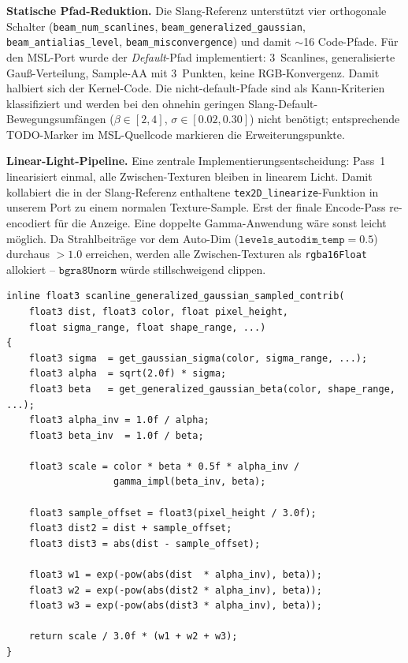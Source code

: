 \documentclass[11pt, a4paper]{article}
\begin{document}
\vspace{.5cm}
\textbf{Statische Pfad-Reduktion.} Die Slang-Referenz unterst\"utzt vier orthogonale Schalter (\texttt{beam\_num\_scanlines}, \texttt{beam\_generalized\_gaussian}, \texttt{beam\_antialias\_level}, \texttt{beam\_misconvergence}) und damit $\sim$16 Code-Pfade. F\"ur den MSL-Port wurde der \textit{Default}-Pfad implementiert: 3~Scanlines, generalisierte Gau\ss-Verteilung, Sample-AA mit 3~Punkten, keine RGB-Konvergenz. Damit halbiert sich der Kernel-Code. Die nicht-default-Pfade sind als Kann-Kriterien klassifiziert und werden bei den ohnehin geringen Slang-Default-Bewegungsumf\"angen ($\beta \in [2,4]$, $\sigma \in [0.02, 0.30]$) nicht ben\"otigt; entsprechende TODO-Marker im MSL-Quellcode markieren die Erweiterungspunkte.

\vspace{.5cm}
\textbf{Linear-Light-Pipeline.} Eine zentrale Implementierungsentscheidung: Pass~1 linearisiert einmal, alle Zwischen-Texturen bleiben in linearem Licht. Damit kollabiert die in der Slang-Referenz enthaltene \texttt{tex2D\_linearize}-Funktion in unserem Port zu einem normalen Texture-Sample. Erst der finale Encode-Pass re-encodiert f\"ur die Anzeige. Eine doppelte Gamma-Anwendung w\"are sonst leicht m\"oglich. Da Strahlbeitr\"age vor dem Auto-Dim ($\texttt{levels\_autodim\_temp} = 0.5$) durchaus $> 1.0$ erreichen, werden alle Zwischen-Texturen als \texttt{rgba16Float} allokiert -- $\texttt{bgra8Unorm}$ w\"urde stillschweigend clippen.

\vspace{.5cm}
\begin{lstlisting}[language=Metal, caption={Pass~2 -- Beam-Beitragsfunktion (3-Sample-Mittelung)}]
inline float3 scanline_generalized_gaussian_sampled_contrib(
    float3 dist, float3 color, float pixel_height,
    float sigma_range, float shape_range, ...)
{
    float3 sigma  = get_gaussian_sigma(color, sigma_range, ...);
    float3 alpha  = sqrt(2.0f) * sigma;
    float3 beta   = get_generalized_gaussian_beta(color, shape_range, ...);
    float3 alpha_inv = 1.0f / alpha;
    float3 beta_inv  = 1.0f / beta;

    float3 scale = color * beta * 0.5f * alpha_inv /
                   gamma_impl(beta_inv, beta);

    float3 sample_offset = float3(pixel_height / 3.0f);
    float3 dist2 = dist + sample_offset;
    float3 dist3 = abs(dist - sample_offset);

    float3 w1 = exp(-pow(abs(dist  * alpha_inv), beta));
    float3 w2 = exp(-pow(abs(dist2 * alpha_inv), beta));
    float3 w3 = exp(-pow(abs(dist3 * alpha_inv), beta));

    return scale / 3.0f * (w1 + w2 + w3);
}
\end{lstlisting}
\end{document}

